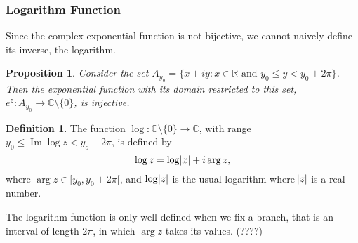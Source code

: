\documentclass[12pt]{article}
\newcommand{\CC}{\mathbb{C}}
\newcommand{\RR}{\mathbb{R}}
\newtheorem{prop}{Proposition}[theorem]
\theoremstyle{definition}
\newtheorem{definition}{Definition}[section]
\DeclareMathOperator{\Ima}{Im}
\begin{document}
\subsubsection{Logarithm Function}
Since the complex exponential function is not bijective, we cannot naively define its inverse, the logarithm. 
\begin{prop}
	Consider the set $A_{y_0} = \{ x + iy : x \in \RR \text{ and } y_0 \leq y < y_0 + 2 \pi \}$.
	Then the exponential function with its domain restricted to this set, $e^z : A_{y_0} \to \CC \setminus \{ 0 \}$, is injective.  
\end{prop}
\begin{definition}
	The function $\log : \CC \setminus \{ 0 \} \to \CC$, with range $y_0 \leq \Ima \log z < y_o + 2 \pi$, is defined by
	\[
		\log z = \log \abs x + i \arg z,
	\]
	where $\arg z \in [y_0 , y_0 + 2 \pi[$, and $\log \abs z$ is the usual logarithm where $\abs z$ is a real number.	
\end{definition}
The logarithm function is only well-defined when we fix a branch, that is an interval of length $2\pi$, in which $\arg z$ takes its values. (????)
\end{document}
